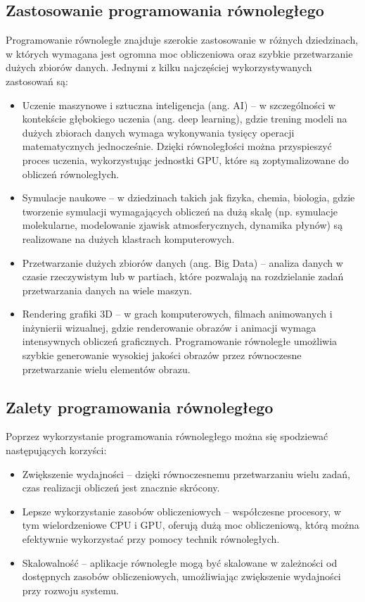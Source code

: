 \subsection{Zastosowanie programowania równoległego}
Programowanie równoległe znajduje szerokie zastosowanie w różnych dziedzinach, w których wymagana jest ogromna moc obliczeniowa oraz szybkie przetwarzanie dużych zbiorów danych. Jednymi z kilku najczęściej wykorzystywanych zastosowań są:
\begin{itemize}
    \item Uczenie maszynowe i sztuczna inteligencja (ang. AI) – w szczególności w kontekście głębokiego uczenia (ang. deep learning), gdzie trening modeli na dużych zbiorach danych wymaga wykonywania tysięcy operacji matematycznych jednocześnie. Dzięki równoległości można przyspieszyć proces uczenia, wykorzystując jednostki GPU, które są zoptymalizowane do obliczeń równoległych.
    \item Symulacje naukowe – w dziedzinach takich jak fizyka, chemia, biologia, gdzie tworzenie symulacji wymagających obliczeń na dużą skalę (np. symulacje molekularne, modelowanie zjawisk atmosferycznych, dynamika płynów) są realizowane na dużych klastrach komputerowych.
    \item Przetwarzanie dużych zbiorów danych (ang. Big Data) – analiza danych w czasie rzeczywistym lub w partiach, które pozwalają na rozdzielanie zadań przetwarzania danych na wiele maszyn.
    \item Rendering grafiki 3D – w grach komputerowych, filmach animowanych i inżynierii wizualnej, gdzie renderowanie obrazów i animacji wymaga intensywnych obliczeń graficznych. Programowanie równoległe umożliwia szybkie generowanie wysokiej jakości obrazów przez równoczesne przetwarzanie wielu elementów obrazu.
\end{itemize}

\subsection{Zalety programowania równoległego}
Poprzez wykorzystanie programowania równoległego można się spodziewać następujących korzyści:
\begin{itemize}
    \item Zwiększenie wydajności – dzięki równoczesnemu przetwarzaniu wielu zadań, czas realizacji obliczeń jest znacznie skrócony.
    \item Lepsze wykorzystanie zasobów obliczeniowych – współczesne procesory, w tym wielordzeniowe CPU i GPU, oferują dużą moc obliczeniową, którą można efektywnie wykorzystać przy pomocy technik równoległych.
    \item Skalowalność – aplikacje równoległe mogą być skalowane w zależności od dostępnych zasobów obliczeniowych, umożliwiając zwiększenie wydajności przy rozwoju systemu.
\end{itemize}

